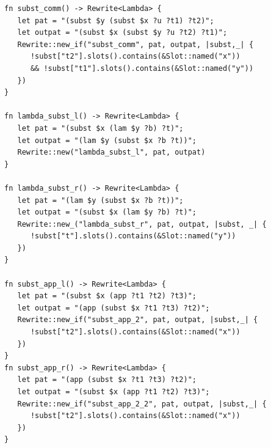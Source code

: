 \begin{listing*}
	\centering
	\begin{minipage}{0.8\textwidth}
	\begin{verbatim}
fn subst_comm() -> Rewrite<Lambda> {
   let pat = "(subst $y (subst $x ?u ?t1) ?t2)";
   let outpat = "(subst $x (subst $y ?u ?t2) ?t1)";
   Rewrite::new_if("subst_comm", pat, outpat, |subst,_| {
      !subst["t2"].slots().contains(&Slot::named("x")) 
      && !subst["t1"].slots().contains(&Slot::named("y"))
   })
}

fn lambda_subst_l() -> Rewrite<Lambda> {
   let pat = "(subst $x (lam $y ?b) ?t)";
   let outpat = "(lam $y (subst $x ?b ?t))";
   Rewrite::new("lambda_subst_l", pat, outpat)
}

fn lambda_subst_r() -> Rewrite<Lambda> {
   let pat = "(lam $y (subst $x ?b ?t))";
   let outpat = "(subst $x (lam $y ?b) ?t)";
   Rewrite::new_("lambda_subst_r", pat, outpat, |subst, _| {
      !subst["t"].slots().contains(&Slot::named("y"))
   })
}

fn subst_app_l() -> Rewrite<Lambda> {
   let pat = "(subst $x (app ?t1 ?t2) ?t3)";
   let outpat = "(app (subst $x ?t1 ?t3) ?t2)";
   Rewrite::new_if("subst_app_2", pat, outpat, |subst,_| {
      !subst["t2"].slots().contains(&Slot::named("x"))
   })
}
fn subst_app_r() -> Rewrite<Lambda> {
   let pat = "(app (subst $x ?t1 ?t3) ?t2)";
   let outpat = "(subst $x (app ?t1 ?t2) ?t3)";
   Rewrite::new_if("subst_app_2_2", pat, outpat, |subst,_| {
      !subst["t2"].slots().contains(&Slot::named("x"))
   })
}
	\end{verbatim}
\end{minipage}
	\caption{Graphical equivalence rules for $\lambda_{\text{lsub}}$}
	\label{listing:graphical_equivalence}
\end{listing*}




